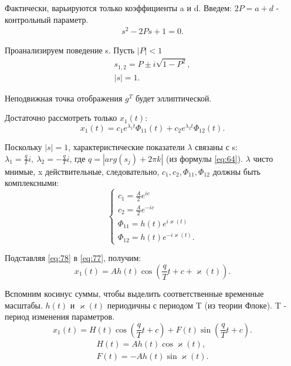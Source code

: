 Фактически, варьируются только коэффициенты a и d. Введем: $2P=a+d$ - контрольный параметр.
\begin{gather*}
	s^2-2Ps+1=0.		
\end{gather*}

Проанализируем поведение s.
Пусть $|P|<1$
\begin{gather*}
	s_{1,2}=P\pm i\sqrt{1-P^2}, \\
	|s|=1.		
\end{gather*}

Неподвижная точка отображения $g^T$ будет эллиптической. 

Достаточно рассмотреть только $x_1(t)$:
\begin{equation}
	x_1(t)=c_1e^{\lambda_1 t}\Phi_{11}(t)+c_2e^{\lambda_2 t}\Phi_{12}(t).
	\label{eq:77}
\end{equation}

Поскольку $|s|=1$, характеристические показатели $\lambda$ связаны с s: $\lambda_1=\frac{q}{T}i,~\lambda_2=-\frac{q}{T}i$, где $q=|arg(s_j)+2\pi k|$ (из формулы \eqref{eq:64}). $\lambda$ чисто мнимые, x действительные, следовательно, $c_1, c_2, \Phi_{11}, \Phi_{12}$ должны быть комплексными:
\begin{equation}
	\begin{cases}
		c_1=\frac{A}{2}e^{ic} \\
		c_2=\frac{A}{2}e^{-ic} \\
		\Phi_{11}=h(t)e^{i\varkappa(t)} \\
		\Phi_{12}=h(t)e^{-i\varkappa(t)}.
	\end{cases}
	\label{eq:78}
\end{equation}

Подставляя \eqref{eq:78} в \eqref{eq:77}, получим:
\begin{equation}
	x_1(t)=Ah(t)\cos (\frac{q}{T}t+c+\varkappa(t)).
	\label{eq:79}
\end{equation}

Вспомним косинус суммы, чтобы выделить соответственные временные масштабы. $h(t)$ и $\varkappa(t)$ периодичны с периодом T (из теории Флоке). T - период изменения параметров.
\begin{equation}
	x_1(t)=H(t)\cos{(\frac{q}{T}t+c)}+F(t)\sin{(\frac{q}{T}t+c)}.
	\label{eq:80}
\end{equation}
\begin{gather*}
	H(t)=Ah(t)\cos \varkappa(t), \\
	F(t)=-Ah(t)\sin \varkappa(t).		
\end{gather*}


